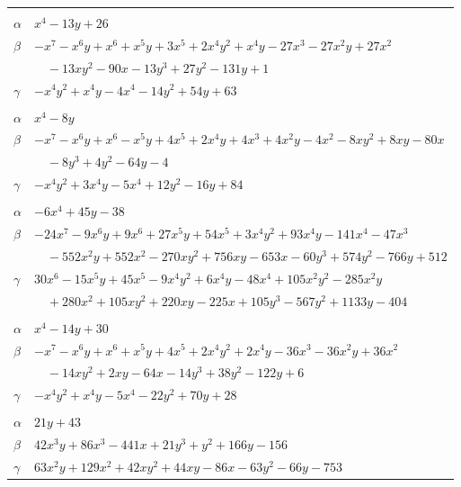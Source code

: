 \documentclass[11pt]{article}
\begin{document}
\begin{longtable}{@{}ll@{}}
\addlinespace[3pt]
\multicolumn{2}{@{}l}{$\{i,j\}=\{7,14\}$, $k_{ij}=3^{3}$}\\
$\alpha$ & $x^{4}-13y+26$\\
$\beta$ & $-x^{7}-x^{6}y+x^{6}+x^{5}y+3x^{5}+2x^{4}y^{2}+x^{4}y-27x^{3}-27x^{2}y+27x^{2}$\\
 & $\quad -13xy^{2}-90x-13y^{3}+27y^{2}-131y+1$\\
$\gamma$ & $-x^{4}y^{2}+x^{4}y-4x^{4}-14y^{2}+54y+63$\\
\addlinespace[3pt]
\multicolumn{2}{@{}l}{$\{i,j\}=\{7,18\}$, $k_{ij}=2^{4}\cdot 5$}\\
$\alpha$ & $x^{4}-8y$\\
$\beta$ & $-x^{7}-x^{6}y+x^{6}-x^{5}y+4x^{5}+2x^{4}y+4x^{3}+4x^{2}y-4x^{2}-8xy^{2}+8xy-80x$\\
 & $\quad -8y^{3}+4y^{2}-64y-4$\\
$\gamma$ & $-x^{4}y^{2}+3x^{4}y-5x^{4}+12y^{2}-16y+84$\\
\addlinespace[3pt]
\multicolumn{2}{@{}l}{$\{i,j\}=\{7,22\}$, $k_{ij}=2\cdot 5\cdot 7$}\\
$\alpha$ & $-6x^{4}+45y-38$\\
$\beta$ & $-24x^{7}-9x^{6}y+9x^{6}+27x^{5}y+54x^{5}+3x^{4}y^{2}+93x^{4}y-141x^{4}-47x^{3}$\\
 & $\quad -552x^{2}y+552x^{2}-270xy^{2}+756xy-653x-60y^{3}+574y^{2}-766y+512$\\
$\gamma$ & $30x^{6}-15x^{5}y+45x^{5}-9x^{4}y^{2}+6x^{4}y-48x^{4}+105x^{2}y^{2}-285x^{2}y$\\
 & $\quad +280x^{2}+105xy^{2}+220xy-225x+105y^{3}-567y^{2}+1133y-404$\\
\addlinespace[3pt]
\multicolumn{2}{@{}l}{$\{i,j\}=\{7,23\}$, $k_{ij}=2^{3}$}\\
$\alpha$ & $x^{4}-14y+30$\\
$\beta$ & $-x^{7}-x^{6}y+x^{6}+x^{5}y+4x^{5}+2x^{4}y^{2}+2x^{4}y-36x^{3}-36x^{2}y+36x^{2}$\\
 & $\quad -14xy^{2}+2xy-64x-14y^{3}+38y^{2}-122y+6$\\
$\gamma$ & $-x^{4}y^{2}+x^{4}y-5x^{4}-22y^{2}+70y+28$\\
\addlinespace[3pt]
\multicolumn{2}{@{}l}{$\{i,j\}=\{9,12\}$, $k_{ij}=2^{7}\cdot 5$}\\
$\alpha$ & $21y+43$\\
$\beta$ & $42x^{3}y+86x^{3}-441x+21y^{3}+y^{2}+166y-156$\\
$\gamma$ & $63x^{2}y+129x^{2}+42xy^{2}+44xy-86x-63y^{2}-66y-753$\\

\end{longtable}
\end{document}
